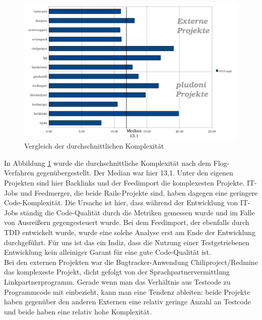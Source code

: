 \begin{figure}[htbp]
 \centering
 \includegraphics[width=\linewidth]{./diagrams/cmp-complex.pdf}
 \caption{Vergleich der durchschnittlichen Komplexität}
 \label{fig:cpm-complex}
\end{figure}
In Abbildung \ref{fig:cpm-complex} wurde die durchschnittliche Komplexität nach dem Flog-Verfahren gegenübergestellt. Der Median war hier 13,1. Unter den eigenen Projekten sind hier Backlinks und der Feedimport die komplexesten Projekte. IT-Jobs und Feedmerger, die beide Rails-Projekte sind, haben dagegen eine geringere Code-Komplexität. Die Ursache ist hier, dass während der Entwicklung von IT-Jobs ständig die Code-Qualität durch die Metriken gemessen wurde und im Falle von Ausreißern gegengesteuert wurde. Bei dem Feedimport, der ebenfalls durch TDD entwickelt wurde, wurde eine solche Analyse erst am Ende der Entwicklung durchgeführt. Für uns ist das ein Indiz, dass die Nutzung einer Testgetriebenen Entwicklung kein alleiniger Garant für eine gute Code-Qualität ist.\\
Bei den externen Projekten war die Bugtracker-Anwendung Chiliproject/Redmine das komplexeste Projekt, dicht gefolgt von der Sprachpartnervermittlung Linkpartnerprogramm. Gerade wenn man das Verhältnis aus Testcode zu Programmcode mit einbezieht, kann man eine Tendenz ableiten: beide Projekte haben gegenüber den anderen Externen eine relativ geringe Anzahl an Testcode und beide haben eine relativ hohe Komplexität.

